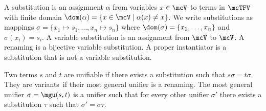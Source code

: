 \begin{definition}\label{def:substitution}
A {\myem substitution} is an assignment $\alpha$ from variables $x\in\mcV$ to terms in $\mcTFV$
with finite {\myem domain} $\dom(\alpha) = \{ x\in\mcV\mid\alpha(x) \neq x \}$.
We write substitutions as mappings $\sigma=\{ x_1\mapsto s_1,\ldots,x_n\mapsto s_n \}$
where $\dom(\sigma)=\{ x_1,\ldots,x_n \}$ and $\sigma(x_i)=s_i$.
A {\myem variable substitution} is an assignment from $\mcV$ to $\mcV$.
A {\myem renaming} is a bijective variable substitution.
A {\myem proper instantiator} is a substitution that is not a variable substitution.
\end{definition}
\begin{definition}\label{def:unifier}
Two terms $s$ and $t$ are {\myem unifiable} if there exists a substitution such that $s\sigma=t\sigma$.
They are {\myem variants} if their most general unifier is a renaming.
The {\myem most general unifier} $\sigma=\mgu(s,t)$ is a unifier such that
for every other unifier $\sigma'$ there exists a substitution $\tau$ such that
$\sigma' = \sigma \tau$. 
\end{definition}
